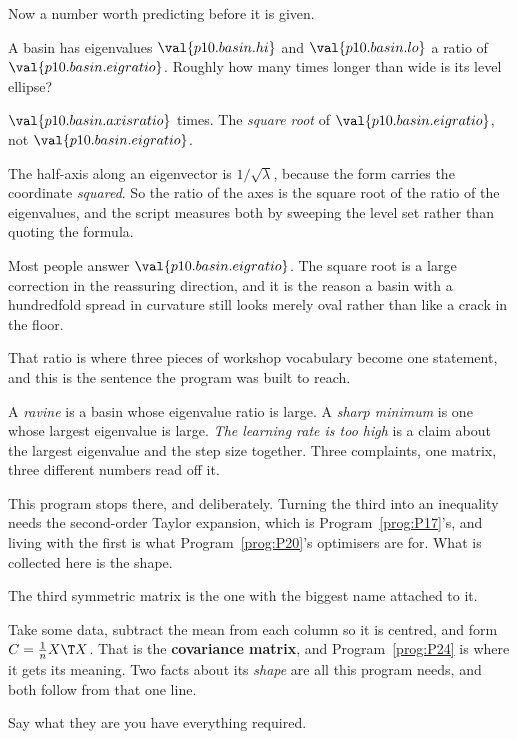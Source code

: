 \begin{fr}
Now a number worth predicting before it is given.

A basin has eigenvalues $\val{p10.basin.hi}$ and $\val{p10.basin.lo}$ \dash{} a
ratio of $\val{p10.basin.eigratio}$. Roughly how many times longer than wide is
its level ellipse?
\dotline
\nextframe
\end{fr}

\begin{fr}
\begin{ansblock}
$\val{p10.basin.axisratio}$ times. The \emph{square root} of
$\val{p10.basin.eigratio}$, not $\val{p10.basin.eigratio}$.
\end{ansblock}

The half-axis along an eigenvector is $1/\sqrt{\lambda}$, because the form
carries the coordinate \emph{squared}. So the ratio of the axes is the square
root of the ratio of the eigenvalues, and the script measures both by sweeping
the level set rather than quoting the formula.

Most people answer $\val{p10.basin.eigratio}$. The square root is a large
correction in the reassuring direction, and it is the reason a basin with a
hundredfold spread in curvature still looks merely oval rather than like a
crack in the floor.
\end{fr}


\begin{fr}
That ratio is where three pieces of workshop vocabulary become one statement,
and this is the sentence the program was built to reach.

A \emph{ravine} is a basin whose eigenvalue ratio is large. A \emph{sharp
minimum} is one whose largest eigenvalue is large. \emph{The learning rate is
too high} is a claim about the largest eigenvalue and the step size together.
Three complaints, one matrix, three different numbers read off it.

This program stops there, and deliberately. Turning the third into an
inequality needs the second-order Taylor expansion, which is
Program~\ref{prog:P17}'s, and living with the first is what
Program~\ref{prog:P20}'s optimisers are for. What is collected here is the
shape.
\end{fr}

\begin{fr}
The third symmetric matrix is the one with the biggest name attached to it.

Take some data, subtract the mean from each column so it is centred, and form
$C = \frac{1}{n}X\T X$. That is the \textbf{covariance matrix}, and
Program~\ref{prog:P24} is where it gets its meaning. Two facts about its
\emph{shape} are all this program needs, and both follow from that one line.

Say what they are \dash{} you have everything required.
\dotline
\nextframe
\end{fr}

